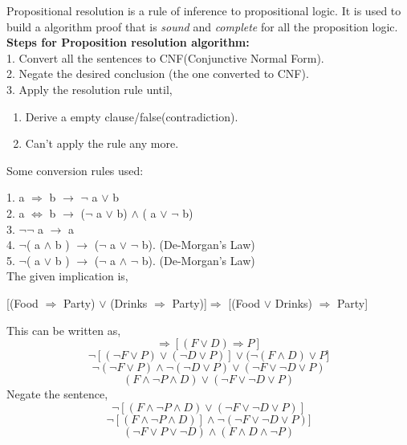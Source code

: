 \documentclass[11pt, a4paper]{report}
\begin{document}
\begin{enumerate}
\begin{itemize}
Propositional resolution is a rule of inference to propositional logic. It is used to build a algorithm proof that is \textit{sound} and \textit{complete} for all the proposition logic.\\

\textbf{Steps for Proposition resolution algorithm:}\\

1. Convert all the sentences to CNF(Conjunctive Normal Form).\\
2. Negate the desired conclusion (the one converted to CNF).\\
3. Apply the resolution rule until,
\begin{enumerate}
\item Derive a empty clause/false(contradiction).
\item Can't apply the rule any more.
\end{enumerate}


\newpage
Some conversion rules used:

1. a $\Rightarrow$ b   $\longrightarrow$   $\neg$ a $\vee$ b \\
2. a $\Longleftrightarrow$ b $\longrightarrow$ ($\neg$ a $\vee$ b) $\wedge$ ( a $\vee$ $\neg$ b)\\
3. $\neg \neg$ a $\longrightarrow$ a\\
4. $\neg$( a $\wedge$ b ) $\longrightarrow$ ($\neg$ a $\vee$ $\neg$ b). (De-Morgan's Law)\\
5. $\neg$( a $\vee$ b ) $\longrightarrow$ ($\neg$ a $\wedge$ $\neg$ b). (De-Morgan's Law)\\

The given implication is,

[(Food $\Rightarrow$ Party) $\vee$ (Drinks $\Rightarrow$ Party)]$ \Rightarrow$ [(Food $\vee$ Drinks) $ \Rightarrow$ Party]

This can be written as,
\begin{equation}
	[(F \Rightarrow P) \vee (D \Rightarrow P)]\Rightarrow [(F \vee D)	\Rightarrow P] 
\end{equation}
\begin{equation}
\neg[(\neg F \vee P) \vee (\neg D \vee P)] \vee (\neg ( F \wedge D) \vee P]
\end{equation}
\begin{equation}
\neg(\neg F \vee P) \wedge \neg ( \neg D \vee P) \vee ( \neg F \vee \neg D \vee P)
\end{equation}
\begin{equation}
(F \wedge \neg P \wedge D) \vee ( \neg F \vee \neg D \vee P)
\end{equation}
Negate the sentence,
\begin{equation}
\neg [(F \wedge \neg P \wedge D) \vee ( \neg F \vee \neg D \vee P)]
\end{equation}
\begin{equation}
\neg [(F \wedge \neg P \wedge D)] \wedge \neg( \neg F \vee \neg D \vee P)]
\end{equation}
\begin{equation}
(\neg F \vee P \vee \neg D) \wedge ( F \wedge D \wedge \neg P)
\end{equation}


\end{itemize}
\end{enumerate}
\end{document}
